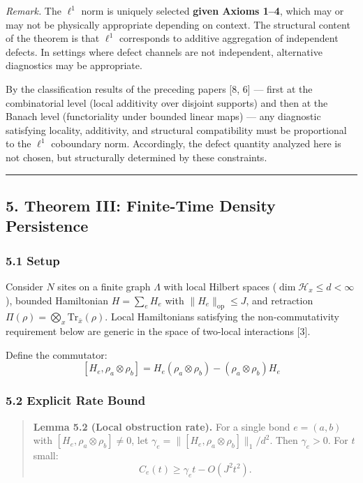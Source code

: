 \documentclass[
]{article}
\begin{document}
\emph{Remark.} The \(\ell^1\) norm is uniquely selected \textbf{given
Axioms 1--4}, which may or may not be physically appropriate depending
on context. The structural content of the theorem is that \(\ell^1\)
corresponds to additive aggregation of independent defects. In settings
where defect channels are not independent, alternative diagnostics may
be appropriate.

By the classification results of the preceding papers {[}8, 6{]} ---
first at the combinatorial level (local additivity over disjoint
supports) and then at the Banach level (functoriality under bounded
linear maps) --- any diagnostic satisfying locality, additivity, and
structural compatibility must be proportional to the \(\ell^1\)
coboundary norm. Accordingly, the defect quantity analyzed here is not
chosen, but structurally determined by these constraints.

\begin{center}\rule{0.5\linewidth}{0.5pt}\end{center}

\subsection{5. Theorem III: Finite-Time Density
Persistence}\label{theorem-iii-finite-time-density-persistence}

\subsubsection{5.1 Setup}\label{setup}

Consider \(N\) sites on a finite graph \(\Lambda\) with local Hilbert
spaces (\(\dim \mathcal{H}_x \leq d < \infty\)), bounded Hamiltonian
\(H = \sum_e H_e\) with \(\|H_e\|_{\text{op}} \leq J\), and retraction
\(\Pi(\rho) = \bigotimes_x \text{Tr}_{\bar{x}}(\rho)\). Local
Hamiltonians satisfying the non-commutativity requirement below are
generic in the space of two-local interactions {[}3{]}.

Define the commutator:
\[[H_e, \rho_a \otimes \rho_b] = H_e(\rho_a \otimes \rho_b) - (\rho_a \otimes \rho_b)H_e\]

\subsubsection{5.2 Explicit Rate Bound}\label{explicit-rate-bound}

\begin{quote}
\textbf{Lemma 5.2 (Local obstruction rate).} For a single bond
\(e = (a,b)\) with \([H_e, \rho_a \otimes \rho_b] \neq 0\), let
\(\gamma_e = \|[H_e, \rho_a \otimes \rho_b]\|_1 / d^2\). Then
\(\gamma_e > 0\). For \(t\) small:
\[C_e(t) \geq \gamma_e t - O(J^2 t^2).\]
\end{quote}
\end{document}
